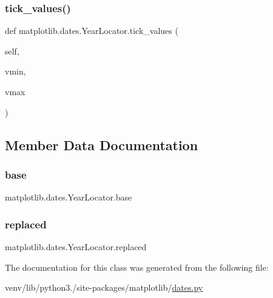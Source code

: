 \subsubsection{\texorpdfstring{tick\+\_\+values()}{tick\_values()}}
{\footnotesize\ttfamily def matplotlib.\+dates.\+Year\+Locator.\+tick\+\_\+values (\begin{DoxyParamCaption}\item[{}]{self,  }\item[{}]{vmin,  }\item[{}]{vmax }\end{DoxyParamCaption})}



\subsection{Member Data Documentation}
\mbox{\label{classmatplotlib_1_1dates_1_1YearLocator_aa35cba0133bd844f4893b1d419d7daa5}} 
\subsubsection{\texorpdfstring{base}{base}}
{\footnotesize\ttfamily matplotlib.\+dates.\+Year\+Locator.\+base}

\mbox{\label{classmatplotlib_1_1dates_1_1YearLocator_ae7b562cf73318408b5573d1faa8cd7f3}} 
\subsubsection{\texorpdfstring{replaced}{replaced}}
{\footnotesize\ttfamily matplotlib.\+dates.\+Year\+Locator.\+replaced}



The documentation for this class was generated from the following file\+:\begin{DoxyCompactItemize}
\item 
venv/lib/python3./site-\/packages/matplotlib/\hyperlink{dates_8py}{dates.\+py}\end{DoxyCompactItemize}
